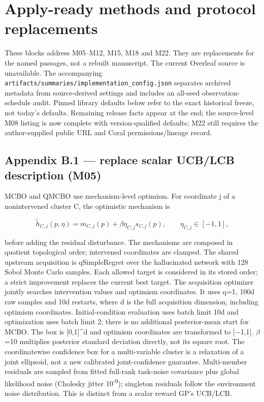 \section*{Apply-ready methods and protocol replacements}

These blocks address M05--M12, M15, M18 and M22. They are replacements for the named passages, not a rebuilt manuscript. The current Overleaf source is unavailable. The accompanying \nolinkurl{artifacts/summaries/implementation_config.json} separates archived metadata from source-derived settings and includes an all-seed observation-schedule audit. Pinned library defaults below refer to the exact historical freeze, not today's defaults. Remaining release facts appear at the end; the source-level M08 listing is now complete with version-qualified defaults; M22 still requires the author-supplied public URL and Coral permissions/lineage record.

\subsection*{Appendix B.1 --- replace scalar UCB/LCB description (M05)}

MCBO and QMCBO use mechanism-level optimism. For coordinate j of a nonintervened cluster C, the optimistic mechanism is

\[
\widetilde h_{C,j}(p,\eta)=m_{C,j}(p)+\beta\eta_{C,j}s_{C,j}(p),\qquad \eta_{C,j}\in[-1,1],
\]

before adding the residual disturbance. The mechanisms are composed in quotient topological order; intervened coordinates are clamped. The shared upstream acquisition is qSimpleRegret over the hallucinated network with 128 Sobol Monte Carlo samples. Each allowed target is considered in its stored order; a strict improvement replaces the current best target. The acquisition optimizer jointly searches intervention values and optimism coordinates. It uses q=1, 100d raw samples and 10d restarts, where d is the full acquisition dimension, including optimism coordinates. Initial-condition evaluation uses batch limit 10d and optimization uses batch limit 2; there is no additional posterior-mean start for MCBO. The box is [0,1]\textasciicircum{}d and optimism coordinates are transformed to [\ensuremath{-}1,1]. \ensuremath{\beta}=10 multiplies posterior standard deviation directly, not its square root. The coordinatewise confidence box for a multi-variable cluster is a relaxation of a joint ellipsoid, not a new calibrated joint-confidence guarantee. Multi-member residuals are sampled from fitted full-rank task-noise covariance plus global likelihood noise (Cholesky jitter 10\textsuperscript{-}\textsuperscript{9}); singleton residuals follow the environment noise distribution. This is distinct from a scalar reward GP's UCB/LCB.

